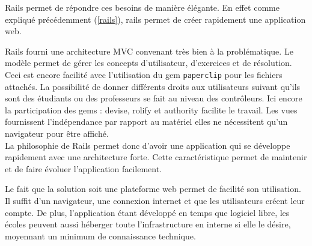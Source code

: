 Rails permet de répondre ces besoins de manière élégante. En effet comme expliqué précédemment (\ref{rails}), rails permet de créer rapidement une application web.

Rails fourni une architecture MVC convenant très bien à la problématique. Le modèle permet de gérer les concepts d'utilisateur, d'exercices et de résolution. Ceci est encore facilité avec l'utilisation du gem \texttt{paperclip} pour les fichiers attachés.  La possibilité de donner différents droits aux utilisateurs suivant qu'ils sont des étudiants ou des professeurs se fait au niveau des contrôleurs. Ici encore la participation des gems : devise, rolify et authority facilite le travail. Les vues fournissent l'indépendance par rapport au matériel elles ne nécessitent qu'un navigateur pour être affiché.\\

La philosophie de Rails permet donc d'avoir une application qui se développe rapidement avec une architecture forte. Cette caractéristique permet de maintenir et de faire évoluer l'application facilement.

Le fait que la solution soit une plateforme web permet de facilité son utilisation. Il suffit d'un navigateur, une connexion internet et que les utilisateurs créent leur compte. De plus, l'application étant développé en temps que logiciel libre, les écoles peuvent aussi héberger toute l'infrastructure en interne si elle le désire, moyennant un minimum de connaissance technique.